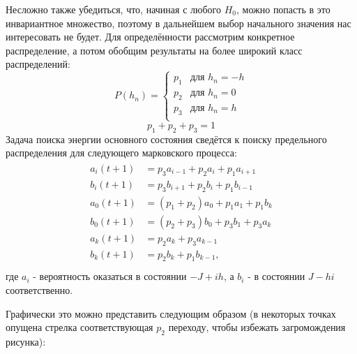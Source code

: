 	Несложно также убедиться, что, начиная с любого $H_0$, можно попасть в это инвариантное множество, поэтому в дальнейшем выбор начального значения нас интересовать не будет.
	Для определённости рассмотрим конкретное распределение, а потом обобщим результаты на более широкий класс распределений:
\begin{equation}
P(h_n) =
\begin{cases}
p_1 &\mbox{для } h_n= -h \\
p_2 &\mbox{для } h_n= 0 \\
p_3 &\mbox{для } h_n= h\\
\end{cases}
\end{equation}
\begin{equation}
p_1+p_2+p_3 = 1
\end{equation}
Задача поиска энергии основного состояния сведётся к поиску предельного распределения для следующего марковского процесса:
\begin{align}
\begin{split}
a_i(t+1) &= p_3 a_{i-1} + p_2 a_i + p_1 a_{i+1}\\
b_i(t+1)&= p_3 b_{i+1} + p_2 b_i + p_1 b_{i-1}\\
a_0(t+1)&= (p_1 + p_2) a_0 + p_1 a_1 + p_1 b_k\\
b_0(t+1) &= (p_2 + p_3) b_0 + p_3 b_1 + p_3 a_k \\
a_k(t+1) &= p_2 a_k + p_3 a_{k-1}\\
b_k(t+1) &= p_2 b_k + p_1 b_{k-1},\\
\end{split}
\end{align}
где $a_i$ - вероятность оказаться в состоянии $-J+ih$, а $b_i$ - в состоянии $J-hi$ соответственно.

Графически это можно представить следующим образом (в некоторых точках опущена стрелка соответствующая $p_2$ переходу, чтобы избежать загромождения рисунка):

